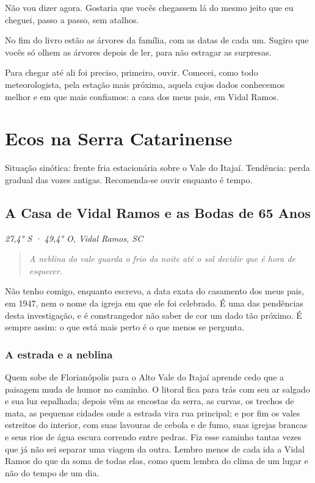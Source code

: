 \documentclass[
  brazilian,
  11pt,
  openany]{book}
\newenvironment{boletim}{\begin{center}\begin{minipage}{0.85\linewidth}\small\itshape}{\end{minipage}\end{center}}
\begin{document}
Não vou dizer agora. Gostaria que vocês chegassem lá do mesmo jeito que
eu cheguei, passo a passo, sem atalhos.

No fim do livro estão as árvores da família, com as datas de cada um.
Sugiro que vocês só olhem as árvores depois de ler, para não estragar as
surpresas.

Para chegar até ali foi preciso, primeiro, ouvir. Comecei, como todo
meteorologista, pela estação mais próxima, aquela cujos dados conhecemos
melhor e em que mais confiamos: a casa dos meus pais, em Vidal Ramos.

\part{Ecos na Serra Catarinense}\label{ecos-na-serra-catarinense}

\begin{boletim}

Situação sinótica: frente fria estacionária sobre o Vale do Itajaí.
Tendência: perda gradual das vozes antigas. Recomenda-se ouvir enquanto
é tempo.

\end{boletim}

\chapter{A Casa de Vidal Ramos e as Bodas de 65 Anos}\label{cap-1}

\emph{27,4° S · 49,4° O, Vidal Ramos, SC}

\begin{quote}
\emph{A neblina do vale guarda o frio da noite até o sol decidir que é
hora de esquecer.}
\end{quote}

Não tenho comigo, enquanto escrevo, a data exata do casamento dos meus
pais, em 1947, nem o nome da igreja em que ele foi celebrado. É uma das
pendências desta investigação, e é constrangedor não saber de cor um
dado tão próximo. É sempre assim: o que está mais perto é o que menos se
pergunta.

\section{A estrada e a neblina}\label{a-estrada-e-a-neblina}

Quem sobe de Florianópolis para o Alto Vale do Itajaí aprende cedo que a
paisagem muda de humor no caminho. O litoral fica para trás com seu ar
salgado e sua luz espalhada; depois vêm as encostas da serra, as curvas,
os trechos de mata, as pequenas cidades onde a estrada vira rua
principal; e por fim os vales estreitos do interior, com suas lavouras
de cebola e de fumo, suas igrejas brancas e seus rios de água escura
correndo entre pedras. Fiz esse caminho tantas vezes que já não sei
separar uma viagem da outra. Lembro menos de cada ida a Vidal Ramos do
que da soma de todas elas, como quem lembra do clima de um lugar e não
do tempo de um dia.
\end{document}
